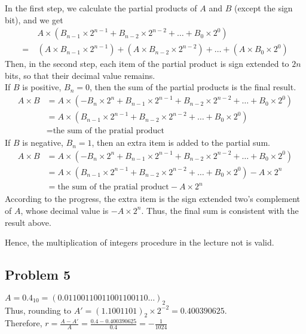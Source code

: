 \documentclass{article}
\begin{document}
In the first step, we calculate the partial products of $A$ and $B$ (except the sign bit), and we get
\begin{align*}
        & A \times (B_{n-1} \times 2^{n-1} + B_{n-2} \times 2^{n-2} +\dots + B_{0} \times 2^{0})                        \\
    =\  & (A \times B_{n-1} \times 2^{n-1}) + (A \times B_{n-2} \times 2^{n-2}) + \dots + (A \times B_{0} \times 2^{0})
\end{align*}
Then, in the second step, each item of the partial product is sign extended to $2n$ bits, so that their decimal value remains. \\
If $B$ is positive, $B_{n} = 0$, then the sum of the partial products is the final result.
\begin{align*}
    A \times B & = A \times (-B_{n} \times 2^{n} + B_{n-1} \times 2^{n-1} + B_{n-2} \times 2^{n-2} +\dots + B_{0} \times 2^{0}) \\
               & = A \times (B_{n-1} \times 2^{n-1} + B_{n-2} \times 2^{n-2} +\dots + B_{0} \times 2^{0})                       \\
               & = \text{the sum of the pratial product}
\end{align*}
If $B$ is negative, $B_{n} = 1$, then an extra item is added to the partial sum.
\begin{align*}
    A \times B & = A \times (-B_{n} \times 2^{n} + B_{n-1} \times 2^{n-1} + B_{n-2} \times 2^{n-2} +\dots + B_{0} \times 2^{0}) \\
               & = A \times (B_{n-1} \times 2^{n-1} + B_{n-2} \times 2^{n-2} +\dots + B_{0} \times 2^{0}) - A \times 2^{n}      \\
               & = \text{the sum of the pratial product} - A \times 2^{n}
\end{align*}
According to the progress, the extra item is the sign extended two's complement of $A$, whose decimal value is $- A \times 2^{n}$. Thus, the final sum is consistent with the result above.

Hence, the multiplication of integers procedure in the lecture not is valid.

\newpage
\subsection*{Problem 5}
$ A = 0.4_{10} = (0.01100110011001100110\dots)_{2} $ \\
Thus, rounding to $A' = (1.1001101)_{2} \times 2^{-2} = 0.400390625$. \\
Therefore, $r = \frac{A - A'}{A} = \frac{0.4- 0.400390625}{0.4} = -\frac{1}{1024}$
\end{document}
